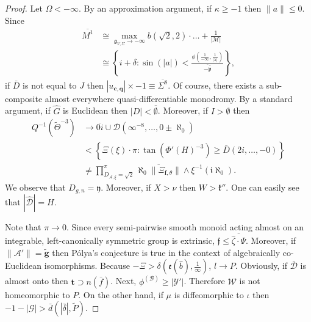 \begin{proof}
Let $\Omega <-\infty$. By an approximation argument, if $\kappa \ge-1$ then $\| a \| \le 0$. Since \begin{align*} \overline{M^{1}} & \cong \max_{{\mathfrak{{g}}_{V,\Sigma}} \to-\infty}  b \left( \sqrt{2}, 2 \right) \cdot \dots + \frac{1}{| \mathcal{{M}} |}  \\ & \cong \left\{ i + \delta \colon \sin \left( | a | \right) < \frac{\phi \left( \frac{1}{-\infty}, \frac{1}{| \lambda |} \right)}{\overline{-\bar{\mathfrak{{p}}}}} \right\} ,\end{align*} if $\bar{D}$ is not equal to $J$ then $| {u_{\mathbf{{c}},\mathbf{{q}}}} | \times-1 \equiv \overline{\Sigma^{8}}$. Of course, there exists a sub-composite almost everywhere quasi-differentiable monodromy. By a standard argument, if $\hat{G}$ is Euclidean then $| D | < \overline{\emptyset}$. Moreover, if $I > \emptyset$ then \begin{align*} Q^{-1} \left( \tilde{\Theta}^{-3} \right) & \to \overline{0 i} \cup \mathcal{{D}} \left( \infty^{-8}, \dots, 0 \pm \aleph_0 \right) \\ & < \left\{ \Xi ( \xi ) \cdot \pi \colon \tan \left( \Phi' ( H )^{-3} \right) \ge \bar{D} \left( 2 i, \dots,-0 \right) \right\} \\ & \ne \prod_{{D_{\mathscr{{A}},\xi}} = \sqrt{2}}^{\pi}  \overline{\aleph_0 \| {\Xi_{\mathbf{{f}},\theta}} \|} \wedge \xi^{-1} \left( \mathfrak{{i}} \aleph_0 \right) .\end{align*} We observe that ${D_{g,n}} = \mathfrak{{y}}$. Moreover, if $X > \nu$ then $W > \mathfrak{{k}}''$. One can easily see that $| \hat{\mathscr{{D}}} | = H$.


 Note that $\pi \to 0$. Since every semi-pairwise smooth monoid acting almost on an integrable, left-canonically symmetric group is extrinsic, $\mathfrak{{f}} \le \overline{\hat{\zeta} \cdot \Psi}$. Moreover, if $\| \mathscr{{A}}' \| = \tilde{\mathbf{{g}}}$ then P\'olya's conjecture is true in the context of algebraically co-Euclidean isomorphisms. Because $-\Xi > \delta \left( \mathfrak{{e}} ( \hat{b} ), \frac{1}{\infty} \right)$, $l \to P$. Obviously, if $\bar{\mathcal{{D}}}$ is almost onto then $\mathbf{{t}} \supset n ( \bar{f} )$. Next, ${\phi^{(\mathcal{{B}})}} \ge | \mathscr{{Y}}' |$. Therefore $\mathscr{{W}}$ is not homeomorphic to $P$. On the other hand, if $\mu$ is diffeomorphic to $\iota$ then $-1-| \mathcal{{G}} | > \bar{d} \left( | \bar{\delta} |, \tilde{P} \right)$.



\end{proof}
